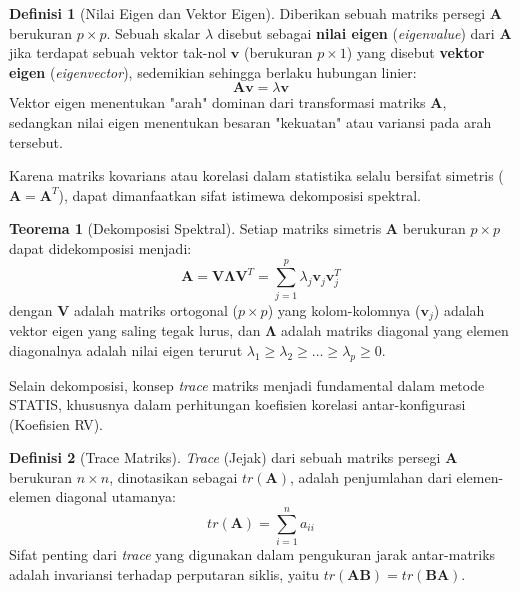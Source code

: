 \documentclass[a4paper]{article}
\theoremstyle{definition} %
\newtheorem{theorem}{Teorema}[section]
\newtheorem{definition}{Definisi}[section]
\begin{document}
\begin{definition}[Nilai Eigen dan Vektor Eigen]
	Diberikan sebuah matriks persegi $\mathbf{A}$ berukuran $p \times p$. Sebuah skalar $\lambda$ disebut sebagai \textbf{nilai eigen} (\textit{eigenvalue}) dari $\mathbf{A}$ jika terdapat sebuah vektor tak-nol $\mathbf{v}$ (berukuran $p \times 1$) yang disebut \textbf{vektor eigen} (\textit{eigenvector}), sedemikian sehingga berlaku hubungan linier:
	\begin{equation}
		\mathbf{A} \mathbf{v} = \lambda \mathbf{v}
	\end{equation}
    Vektor eigen menentukan "arah" dominan dari transformasi matriks $\mathbf{A}$, sedangkan nilai eigen menentukan besaran "kekuatan" atau variansi pada arah tersebut.
\end{definition}

Karena matriks kovarians atau korelasi dalam statistika selalu bersifat simetris ($\mathbf{A} = \mathbf{A}^T$), dapat dimanfaatkan sifat istimewa dekomposisi spektral.

\begin{theorem}[Dekomposisi Spektral]
	Setiap matriks simetris $\mathbf{A}$ berukuran $p \times p$ dapat didekomposisi menjadi:
	\begin{equation}
		\mathbf{A} = \mathbf{V} \mathbf{\Lambda} \mathbf{V}^T = \sum_{j=1}^{p} \lambda_j \mathbf{v}_j \mathbf{v}_j^T
	\end{equation}
	dengan $\mathbf{V}$ adalah matriks ortogonal ($p \times p$) yang kolom-kolomnya ($\mathbf{v}_j$) adalah vektor eigen yang saling tegak lurus, dan $\mathbf{\Lambda}$ adalah matriks diagonal yang elemen diagonalnya adalah nilai eigen terurut $\lambda_1 \ge \lambda_2 \ge \dots \ge \lambda_p \ge 0$.
\end{theorem}

Selain dekomposisi, konsep \textit{trace} matriks menjadi fundamental dalam metode STATIS, khususnya dalam perhitungan koefisien korelasi antar-konfigurasi (Koefisien RV).

\begin{definition}[Trace Matriks]
	\textit{Trace} (Jejak) dari sebuah matriks persegi $\mathbf{A}$ berukuran $n \times n$, dinotasikan sebagai $tr(\mathbf{A})$, adalah penjumlahan dari elemen-elemen diagonal utamanya:
	\begin{equation}
		tr(\mathbf{A}) = \sum_{i=1}^{n} a_{ii}
	\end{equation}
	Sifat penting dari \textit{trace} yang digunakan dalam pengukuran jarak antar-matriks adalah invariansi terhadap perputaran siklis, yaitu $tr(\mathbf{AB}) = tr(\mathbf{BA})$.
\end{definition}
\end{document}
